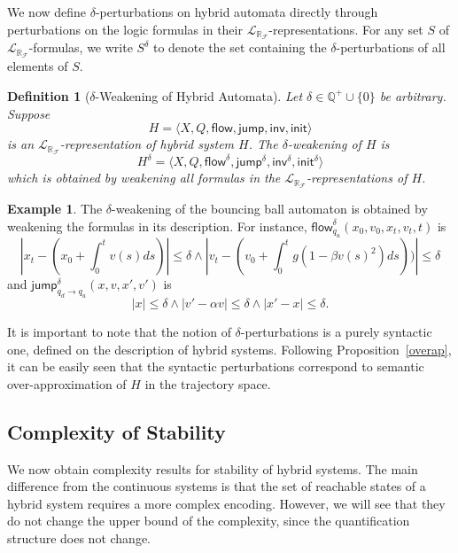 \documentclass[10pt]{article}
\theoremstyle{plain}
\newtheorem{definition}[theorem]{Definition}
\theoremstyle{definition}
\newtheorem{example}[theorem]{Example}
\newcommand{\flow}{\mathsf{flow}}
\newcommand{\jump}{\mathsf{jump}}
\newcommand{\inv}{\mathsf{inv}}
\newcommand{\init}{\mathsf{init}}
\newcommand{\lrf}{\mathcal{L}_{\mathbb{R}_{\mathcal{F}}}}
\begin{document}
We now define $\delta$-perturbations on hybrid automata directly through perturbations on the logic formulas in their $\lrf$-representations. For any set $S$ of $\lrf$-formulas, we write $S^{\delta}$ to denote the set containing the $\delta$-perturbations of all elements of $S$.
\begin{definition}[$\delta$-Weakening of Hybrid Automata] Let $\delta\in\mathbb{Q}^+\cup\{0\}$ be arbitrary. Suppose
$$H = \langle X, Q, \flow, \jump, \inv, \init\rangle$$
is an $\lrf$-representation of hybrid system $H$. The {\em $\delta$-weakening} of $H$ is
$$H^{\delta} = \langle X, Q, \flow^{\delta}, \jump^{\delta}, \inv^{\delta}, \init^{\delta}\rangle$$
which is obtained by weakening all formulas in the $\lrf$-representations of $H$.
\end{definition}
\begin{example}
The $\delta$-weakening of the bouncing ball automaton is obtained by weakening the formulas in its description. For instance, $\flow_{q_u}^{\delta}(x_0, v_0, x_t, v_t, t)$ is
{$$|x_t - (x_0 + \int_0^{t} v(s) ds)|\leq \delta \wedge |v_t - (v_0 + \int_0^t g(1-\beta v(s)^2) ds))|\leq \delta$$}
and $\jump_{q_d \rightarrow q_u}^{\delta} (x, v, x', v')$ is {$$|x|\leq \delta \wedge |v' - \alpha v|\leq \delta \wedge |x'-x|\leq \delta.$$}
\end{example}
It is important to note that the notion of $\delta$-perturbations is a purely syntactic one, defined on the description of hybrid systems. Following Proposition~\ref{overap}, it can be easily seen that the syntactic perturbations correspond to semantic over-approximation of $H$ in the trajectory space.

\subsection{Complexity of Stability}
We now obtain complexity results for stability of hybrid systems. The main difference from the continuous systems is that the set of reachable states of a hybrid system requires a more complex encoding. However, we will see that they do not change the upper bound of the complexity, since the quantification structure does not change.  
\end{document}
